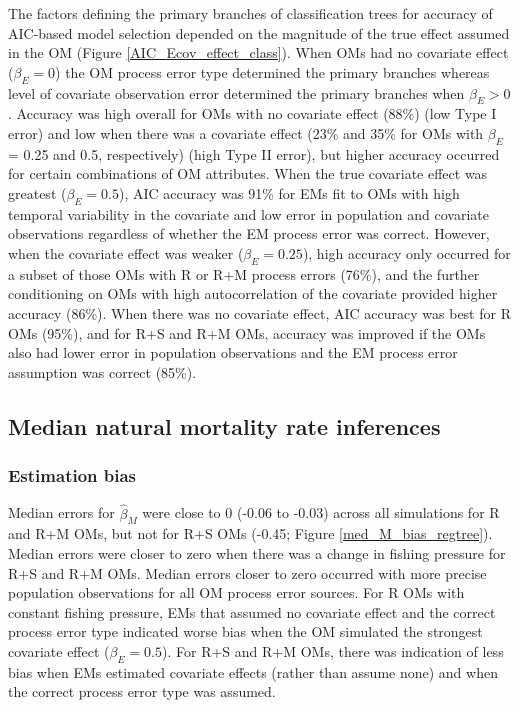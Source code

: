 \documentclass[
  12pt,
]{article}
\begin{document}
The factors defining the primary branches of classification trees for
accuracy of AIC-based model selection depended on the magnitude of the
true effect assumed in the OM (Figure \ref{AIC_Ecov_effect_class}). When
OMs had no covariate effect (\(\beta_E = 0\)) the OM process error type
determined the primary branches whereas level of covariate observation
error determined the primary branches when \(\beta_E>0\). Accuracy was
high overall for OMs with no covariate effect (88\%) (low Type I error)
and low when there was a covariate effect (23\% and 35\% for OMs with
\(\beta_E\) = 0.25 and 0.5, respectively) (high Type II error), but
higher accuracy occurred for certain combinations of OM attributes. When
the true covariate effect was greatest (\(\beta_E = 0.5\)), AIC accuracy
was 91\% for EMs fit to OMs with high temporal variability in the
covariate and low error in population and covariate observations
regardless of whether the EM process error was correct. However, when
the covariate effect was weaker (\(\beta_E = 0.25\)), high accuracy only
occurred for a subset of those OMs with R or R+M process errors (76\%),
and the further conditioning on OMs with high autocorrelation of the
covariate provided higher accuracy (86\%). When there was no covariate
effect, AIC accuracy was best for R OMs (95\%), and for R+S and R+M OMs,
accuracy was improved if the OMs also had lower error in population
observations and the EM process error assumption was correct (85\%).

\subsection*{Median natural mortality rate
inferences}\label{median-natural-mortality-rate-inferences}

\subsubsection*{Estimation bias}\label{estimation-bias}

Median errors for \(\widehat \beta_M\) were close to 0 (-0.06 to -0.03)
across all simulations for R and R+M OMs, but not for R+S OMs (-0.45;
Figure \ref{med_M_bias_regtree}). Median errors were closer to zero when
there was a change in fishing pressure for R+S and R+M OMs. Median
errors closer to zero occurred with more precise population observations
for all OM process error sources. For R OMs with constant fishing
pressure, EMs that assumed no covariate effect and the correct process
error type indicated worse bias when the OM simulated the strongest
covariate effect (\(\beta_E = 0.5\)). For R+S and R+M OMs, there was
indication of less bias when EMs estimated covariate effects (rather
than assume none) and when the correct process error type was assumed.
\end{document}
